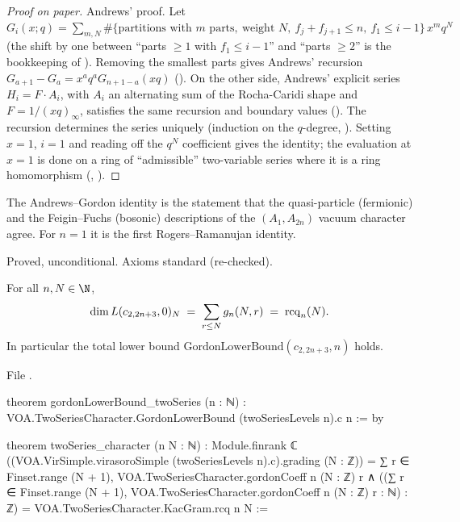 \begin{proof}[Proof on paper]
Andrews' proof. Let $G_i(x;q)=\sum_{m,N}\#\{\text{partitions with }m\text{ parts},\ \text{weight }N,\ f_j+f_{j+1}\le n,
\ f_1\le i-1\}\,x^mq^N$ (the shift by one between ``parts $\ge1$ with $f_1\le i-1$'' and ``parts $\ge2$'' is the
bookkeeping of ). Removing the smallest parts gives Andrews' recursion
$G_{a+1}-G_a=x^aq^aG_{n+1-a}(xq)$ (). On the other side, Andrews' explicit series
$H_i=F\cdot A_i$, with $A_i$ an alternating sum of the Rocha-Caridi shape and $F=1/(xq)_\infty$, satisfies the same
recursion and boundary values (). The recursion determines the series uniquely (induction on the
$q$-degree, ). Setting $x=1$, $i=1$ and reading off the $q^N$ coefficient gives the identity; the
evaluation at $x=1$ is done on a ring of ``admissible'' two-variable series where it is a ring homomorphism
(, ).
\end{proof}

\begin{physics}
The Andrews--Gordon identity is the statement that the quasi-particle (fermionic) and the Feigin--Fuchs (bosonic)
descriptions of the $(A_1,A_{2n})$ vacuum character agree. For $n=1$ it is the first Rogers--Ramanujan identity.
\end{physics}

\begin{status}
Proved, unconditional. Axioms standard (re-checked).
\end{status}

\begin{theorem}\label{l29:thm:character}
For all $n,N\in\N$,
\begin{equation*}
\dim L(c_{2,2n+3},0)_N\;=\;\sum_{r\le N}g_n(N,r)\;=\;\mathrm{rcq}_n(N).
\end{equation*}
In particular the total lower bound $\mathrm{GordonLowerBound}(c_{2,2n+3},n)$ holds.
\end{theorem}

\noindent File .
\begin{leancode}
theorem gordonLowerBound_twoSeries (n : ℕ) :
    VOA.TwoSeriesCharacter.GordonLowerBound (twoSeriesLevels n).c n := by

theorem twoSeries_character (n N : ℕ) :
    Module.finrank ℂ ((VOA.VirSimple.virasoroSimple (twoSeriesLevels n).c).grading (N : ℤ)) =
      ∑ r ∈ Finset.range (N + 1), VOA.TwoSeriesCharacter.gordonCoeff n (N : ℤ) r ∧
    ((∑ r ∈ Finset.range (N + 1), VOA.TwoSeriesCharacter.gordonCoeff n (N : ℤ) r : ℕ) : ℤ) =
      VOA.TwoSeriesCharacter.KacGram.rcq n N :=
\end{leancode}

